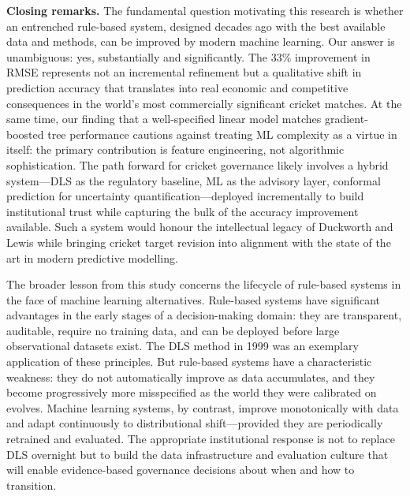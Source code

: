 \documentclass[10pt,a4paper,twocolumn]{article}
\begin{document}
\textbf{Closing remarks.} The fundamental question motivating this research is whether an entrenched rule-based system, designed decades ago with the best available data and methods, can be improved by modern machine learning. Our answer is unambiguous: yes, substantially and significantly. The 33\% improvement in RMSE represents not an incremental refinement but a qualitative shift in prediction accuracy that translates into real economic and competitive consequences in the world's most commercially significant cricket matches. At the same time, our finding that a well-specified linear model matches gradient-boosted tree performance cautions against treating ML complexity as a virtue in itself: the primary contribution is feature engineering, not algorithmic sophistication. The path forward for cricket governance likely involves a hybrid system---DLS as the regulatory baseline, ML as the advisory layer, conformal prediction for uncertainty quantification---deployed incrementally to build institutional trust while capturing the bulk of the accuracy improvement available. Such a system would honour the intellectual legacy of Duckworth and Lewis while bringing cricket target revision into alignment with the state of the art in modern predictive modelling.

The broader lesson from this study concerns the lifecycle of rule-based systems in the face of machine learning alternatives. Rule-based systems have significant advantages in the early stages of a decision-making domain: they are transparent, auditable, require no training data, and can be deployed before large observational datasets exist. The DLS method in 1999 was an exemplary application of these principles. But rule-based systems have a characteristic weakness: they do not automatically improve as data accumulates, and they become progressively more misspecified as the world they were calibrated on evolves. Machine learning systems, by contrast, improve monotonically with data and adapt continuously to distributional shift---provided they are periodically retrained and evaluated. The appropriate institutional response is not to replace DLS overnight but to build the data infrastructure and evaluation culture that will enable evidence-based governance decisions about when and how to transition.
\end{document}
